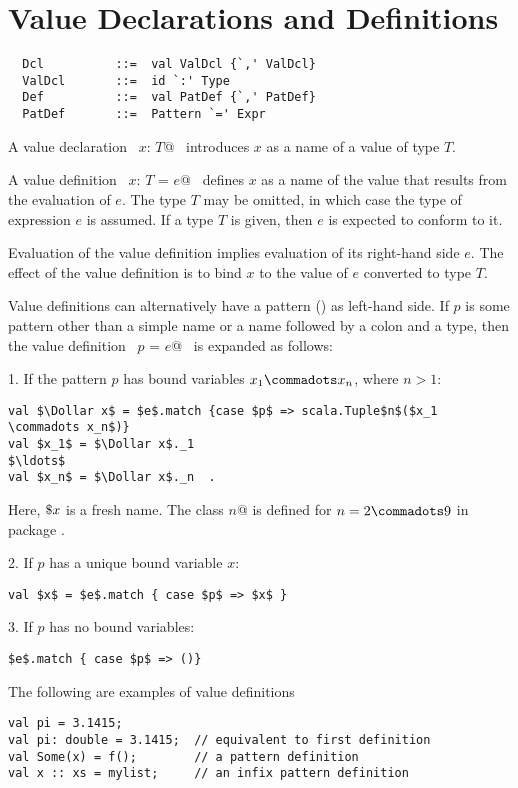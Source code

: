 \documentclass[a4paper,12pt,twoside,titlepage]{book}
\begin{document}
\section{Value Declarations and Definitions}
\label{sec:valdef}

\syntax\begin{lstlisting}
  Dcl          ::=  val ValDcl {`,' ValDcl}
  ValDcl       ::=  id `:' Type
  Def          ::=  val PatDef {`,' PatDef}
  PatDef       ::=  Pattern `=' Expr
\end{lstlisting}

A value declaration ~\lstinline@val $x$: $T$@~ introduces $x$ as a name of a value of
type $T$.  

A value definition ~\lstinline@val $x$: $T$ = $e$@~ defines $x$ as a name of the
value that results from the evaluation of $e$. The type $T$ may be
omitted, in which case the type of expression $e$ is assumed.
If a type $T$ is given, then $e$ is expected to conform to it.

Evaluation of the value definition implies evaluation of its
right-hand side $e$.  The effect of the value definition is to bind
$x$ to the value of $e$ converted to type $T$.

Value definitions can alternatively have a pattern
() as left-hand side.  If $p$ is some pattern other
than a simple name or a name followed by a colon and a type, then the
value definition ~\lstinline@val $p$ = $e$@~ is expanded as follows:

1. If the pattern $p$ has bound variables $x_1 \commadots x_n$, where $n > 1$:
\begin{lstlisting}
val $\Dollar x$ = $e$.match {case $p$ => scala.Tuple$n$($x_1 \commadots x_n$)}
val $x_1$ = $\Dollar x$._1
$\ldots$
val $x_n$ = $\Dollar x$._n  .
\end{lstlisting}
Here, $\mbox{\$} x$ is a fresh name.  The class
\lstinline@Tuple$n$@ is defined for $n = 2 \commadots 9$ in package
.

2. If $p$ has a unique bound variable $x$:
\begin{lstlisting}
val $x$ = $e$.match { case $p$ => $x$ }
\end{lstlisting}

3. If $p$ has no bound variables:
\begin{lstlisting}
$e$.match { case $p$ => ()}
\end{lstlisting}

\example
The following are examples of value definitions
\begin{lstlisting}
val pi = 3.1415;
val pi: double = 3.1415;  // equivalent to first definition
val Some(x) = f();        // a pattern definition
val x :: xs = mylist;     // an infix pattern definition
\end{lstlisting}
\end{document}
